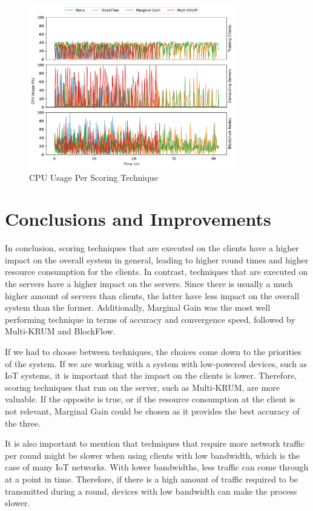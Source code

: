\begin{figure}[!hpb]
    \centering
    \centering
    \includegraphics[width=0.8\textwidth]{graphics/scoring/cpu.pdf}
    \caption{CPU Usage Per Scoring Technique}
    \label{fig:cpu_scoring}
\end{figure}

\vfill

\section{Conclusions and Improvements}

In conclusion, scoring techniques that are executed on the clients have a higher impact on the overall system in general, leading to higher round times and higher resource consumption for the clients. In contrast, techniques that are executed on the servers have a higher impact on the servers. Since there is usually a much higher amount of servers than clients, the latter have less impact on the overall system than the former. Additionally, Marginal Gain was the most well performing technique in terms of accuracy and convergence speed, followed by Multi-KRUM and BlockFlow.

If we had to choose between techniques, the choices come down to the priorities of the system. If we are working with a system with low-powered devices, such as IoT systems, it is important that the impact on the clients is lower. Therefore, scoring techniques that run on the server, such as Multi-KRUM, are more valuable. If the opposite is true, or if the resource consumption at the client is not relevant, Marginal Gain could be chosen as it provides the best accuracy of the three.

It is also important to mention that techniques that require more network traffic per round might be slower when using clients with low bandwidth, which is the case of many IoT networks. With lower bandwidths, less traffic can come through at a point in time. Therefore, if there is a high amount of traffic required to be transmitted during a round, devices with low bandwidth can make the process slower.

